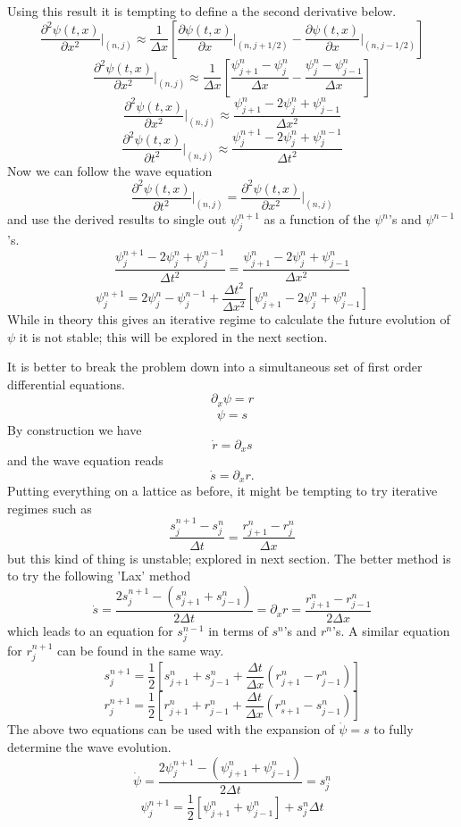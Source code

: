 \documentclass[11pt, oneside]{report}  %
\numberwithin{equation}{section}
\begin{document}
Using this result it is tempting to define a the second derivative below.
$$ \frac{\partial^2 \psi(t,x)}{\partial x^2}\Bigg|_{(n,j)} \approx \frac{1}{\Delta x}\left[\frac{\partial \psi(t,x)}{\partial x}\Bigg|_{(n,j+1/2)}-\frac{\partial \psi(t,x)}{\partial x}\Bigg|_{(n,j-1/2)} \right]$$
$$ \frac{\partial^2 \psi(t,x)}{\partial x^2}\Bigg|_{(n,j)} \approx \frac{1}{\Delta x}\left[\frac{\psi^n_{j+1}-\psi^n_j}{\Delta x}-\frac{\psi^n_{j}-\psi^n_{j-1}}{\Delta x}\right]$$
$$ \frac{\partial^2 \psi(t,x)}{\partial x^2}\Bigg|_{(n,j)} \approx \frac{\psi^n_{j+1}-2\psi^n_j + \psi^n_{j-1}}{\Delta x^2}$$
$$ \frac{\partial^2 \psi(t,x)}{\partial t^2}\Bigg|_{(n,j)} \approx \frac{\psi^{n+1}_{j}-2\psi^n_j + \psi^{n-1}_{j}}{\Delta t^2}$$
Now we can follow the wave equation
$$ \frac{\partial^2 \psi(t,x)}{\partial t^2}\Bigg|_{(n,j)} = \frac{\partial^2 \psi(t,x)}{\partial x^2}\Bigg|_{(n,j)}$$
and use the derived results to single out $\psi^{n+1}_{j}$ as a function of the $\psi^n$'s and $\psi^{n-1}$'s.
$$\frac{\psi^{n+1}_{j}-2\psi^n_j + \psi^{n-1}_{j}}{\Delta t^2} =   \frac{\psi^n_{j+1}-2\psi^n_j + \psi^n_{j-1}}{\Delta x^2}$$
$$ \boxed{\psi^{n+1}_j = 2\psi^n_j - \psi^{n-1}_j+ \frac{\Delta t^2}{\Delta x^2}\left[ \psi^n_{j+1}-2\psi^n_j + \psi^n_{j-1}\right]}$$
While in theory this gives an iterative regime to calculate the future evolution of $\psi$ it is not stable; this will be explored in the next section. 

It is better to break the problem down into a simultaneous set of first order differential equations.
$$ \partial_x \psi = r$$
$$ \dot \psi = s$$
By construction we have 
$$ \dot r = \partial_x s$$
and the wave equation reads 
$$\dot s = \partial_x r .$$
Putting everything on a lattice as before, it might be tempting to try iterative regimes such as 
$$ \frac{s^{n+1}_j - s^n_j}{\Delta t} = \frac{r^n_{j+1}-r^n_j}{\Delta x} $$
but this kind of thing is unstable; explored in next section. The better method is to try the following 'Lax' method
$$ \dot s = \frac{2s^{n+1}_j - (s^{n}_{j+1}+s^{n}_{j-1})}{2 \Delta t} = \partial_x r= \frac{r^n_{j+1}-r^n_{j-1}}{2 \Delta x}$$
which leads to an equation for $s^{n-1}_j$ in terms of $s^n$'s and $r^n$'s. A similar equation for $r^{n+1}_j$ can be found in the same way.
$$ \boxed{s^{n+1}_j = \frac{1}{2}\left[s^{n}_{j+1}+s^{n}_{j-1} + \frac{\Delta t}{\Delta x}\left( r^n_{j+1}-r^n_{j-1}\right) \right]}$$
$$ \boxed{r^{n+1}_j = \frac{1}{2}\left[r^{n}_{j+1}+r^{n}_{j-1} + \frac{\Delta t}{\Delta x}\left( r^n_{s+1}-s^n_{j-1}\right) \right]}$$
The above two equations can be used with the expansion of $\dot \psi = s$ to fully determine the wave evolution.
$$ \dot \psi = \frac{2\psi^{n+1}_j - (\psi^n_{j+1}+\psi^n_{j-1})}{2\Delta t} = s^n_j$$
$$ \boxed{\psi^{n+1}_j = \frac{1}{2}\left[\psi^n_{j+1}+\psi^n_{j-1}\right]+ s^n_j\Delta t  }$$
\end{document}
